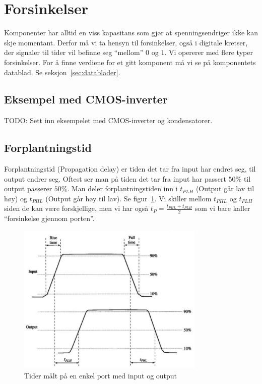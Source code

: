 \documentclass[12pt,a4paper,norsk]{article}
\begin{document}
\section{Forsinkelser}\label{sec:forsinkelser}
Komponenter har alltid en viss kapasitans som gjør at spenningsendriger ikke kan
skje momentant. Derfor må vi ta hensyn til forsinkelser, også i digitale
kretser, der signaler til tider vil befinne seg ``mellom'' $0$ og $1$. Vi
opererer med flere typer forsinkelser. For å finne verdiene for et gitt
komponent må vi se på komponentets datablad. Se seksjon~\ref{sec:datablader}.

\subsection{Eksempel med CMOS-inverter}
TODO\@: Sett inn eksempelet med CMOS-inverter og kondensatorer.

\subsection{Forplantningstid}
Forplantningstid (Propagation delay) er tiden det tar fra input har
endret seg, til output endrer seg. Oftest ser man på tiden det tar fra input har
passert $50\%$ til output passerer $50\%$. Man deler
forplantningstiden inn i $t_{PLH}$ (Output går lav til høy) og $t_{PHL}$ (Output
går høy til lav). Se figur~\ref{fig:delay}. Vi skiller mellom $t_{PHL}$ og
$t_{PLH}$ siden de kan være forskjellige, men vi har også
$t_{P} = \frac{t_{PHL}+t_{PLH}}{2}$ som vi bare kaller ``forsinkelse gjennom porten''.

\begin{figure}[hbt!]
  \centering
  \includegraphics[width=0.8\textwidth,height=0.8\textheight,keepaspectratio]{Krets_Delay}
  \caption{Tider målt på en enkel port med input og output\label{fig:delay}}
\end{figure}
\end{document}
